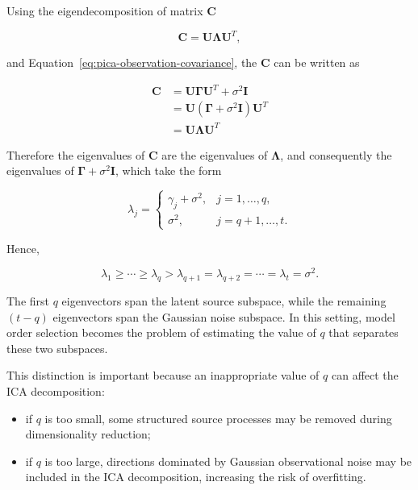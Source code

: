 \documentclass[english]{pwr_wmat_praca_dyplomowa}
\theoremstyle{definition}
\theoremstyle{remark}
\begin{document}
\newpage
Using the eigendecomposition of matrix $\mathbf{C}$

\begin{equation}
    \mathbf{C} = \mathbf{U} \boldsymbol{\Lambda} \mathbf{U}^T,
\end{equation}

and Equation~\eqref{eq:pica-observation-covariance}, the $\mathbf{C}$ can be written as

\begin{equation}
\begin{aligned}
    \mathbf{C}
    &= \mathbf{U} \boldsymbol{\Gamma} \mathbf{U}^T + \sigma^2\mathbf{I} \\
    &= \mathbf{U} \left(\boldsymbol{\Gamma} + \sigma^2\mathbf{I} \right) \mathbf{U}^T \\
    &= \mathbf{U} \boldsymbol{\Lambda} \mathbf{U}^T
\end{aligned}
\end{equation}

Therefore the eigenvalues of $\mathbf{C}$ are the eigenvalues of $\boldsymbol{\Lambda}$, and consequently the eigenvalues of $\boldsymbol{\Gamma} + \sigma^2 \mathbf{I}$, which take the form

\begin{equation}
    \lambda_j =
    \begin{cases}
        \gamma_j+\sigma^2, & j=1,\ldots,q, \\
        \sigma^2, & j=q+1,\ldots,t.
    \end{cases}
\end{equation}

Hence,

\begin{equation}
    \lambda_1 \geq \cdots \geq \lambda_q > \lambda_{q+1} = \lambda_{q+2} = \cdots = \lambda_t = \sigma^2.
\end{equation}

The first $q$ eigenvectors span the latent source subspace, while the remaining $(t-q)$ eigenvectors span the Gaussian noise subspace. In this setting, model order selection becomes the problem of estimating the value of $q$ that separates these two subspaces.

This distinction is important because an inappropriate value of $q$ can affect the ICA decomposition:

\begin{itemize}
    \item if $q$ is too small, some structured source processes may be removed during dimensionality reduction;
    \item if $q$ is too large, directions dominated by Gaussian observational noise may be included in the ICA decomposition, increasing the risk of overfitting.
\end{itemize}
\end{document}
